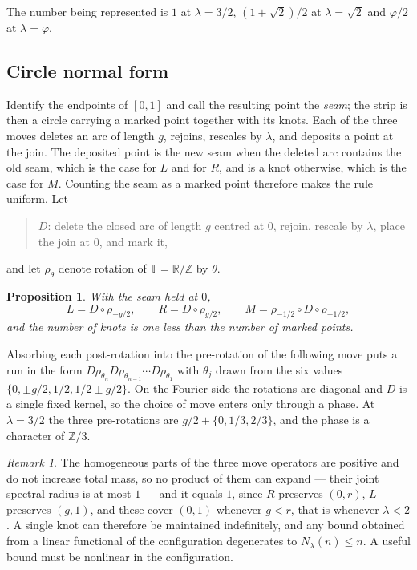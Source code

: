 \documentclass[11pt,reqno]{amsart}
\theoremstyle{plain}
\newtheorem{proposition}[theorem]{Proposition}
\theoremstyle{definition}
\theoremstyle{remark}
\newtheorem{remark}[theorem]{Remark}
\newcommand{\Z}{\mathbb{Z}}
\newcommand{\R}{\mathbb{R}}
\newcommand{\T}{\mathbb{T}}
\begin{document}
The number being represented is $1$ at $\lambda=3/2$, $(1+\sqrt2)/2$ at
$\lambda=\sqrt2$ and $\varphi/2$ at $\lambda=\varphi$.

\subsection{Circle normal form}

Identify the endpoints of $[0,1]$ and call the resulting point the \emph{seam};
the strip is then a circle carrying a marked point together with its knots. Each
of the three moves deletes an arc of length $g$, rejoins, rescales by $\lambda$,
and deposits a point at the join. The deposited point is the new seam when the
deleted arc contains the old seam, which is the case for $L$ and for $R$, and is
a knot otherwise, which is the case for $M$. Counting the seam as a marked point
therefore makes the rule uniform. Let
\begin{quote}
$D$: delete the closed arc of length $g$ centred at $0$, rejoin, rescale by
$\lambda$, place the join at $0$, and mark it,
\end{quote}
and let $\rho_\theta$ denote rotation of $\T=\R/\Z$ by $\theta$.

\begin{proposition}\label{prop:circle}
With the seam held at $0$,
\[
  L=D\circ\rho_{-g/2},\qquad R=D\circ\rho_{g/2},\qquad
  M=\rho_{-1/2}\circ D\circ\rho_{-1/2},
\]
and the number of knots is one less than the number of marked points.
\end{proposition}

Absorbing each post-rotation into the pre-rotation of the following move puts a
run in the form $D\rho_{\theta_n}D\rho_{\theta_{n-1}}\cdots D\rho_{\theta_1}$
with $\theta_j$ drawn from the six values $\{0,\pm g/2,1/2,1/2\pm g/2\}$. On the
Fourier side the rotations are diagonal and $D$ is a single fixed kernel, so the
choice of move enters only through a phase. At $\lambda=3/2$ the three
pre-rotations are $g/2+\{0,1/3,2/3\}$, and the phase is a character of $\Z/3$.

\begin{remark}\label{rem:jsr}
The homogeneous parts of the three move operators are positive and do not
increase total mass, so no product of them can expand --- their joint spectral
radius is at most $1$ --- and it
equals $1$, since $R$ preserves $(0,r)$, $L$ preserves $(g,1)$, and these cover
$(0,1)$ whenever $g<r$, that is whenever $\lambda<2$. A single knot can
therefore be maintained indefinitely, and any bound obtained from a linear
functional of the configuration degenerates to $N_\lambda(n)\leq n$. A useful
bound must be nonlinear in the configuration.
\end{remark}
\end{document}

